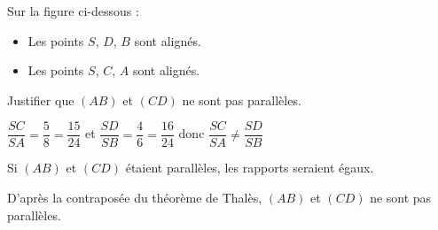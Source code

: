     \phantom{rrr}

    \begin{multicols}{2}
        Sur la figure ci-dessous :
        \begin{itemize}
            \item Les points $S$, $D$, $B$ sont alignés.
            \item Les points $S$, $C$, $A$ sont alignés.
        \end{itemize}

        \columnbreak
        Justifier que $(AB)$ et $(CD)$ ne sont pas parallèles.

        \smallskip
        {\color{red} $\dfrac{SC}{SA}=\dfrac{5}{8}=\dfrac{15}{24}$ et $\dfrac{SD}{SB}=\dfrac{4}{6}=\dfrac{16}{24}$ donc $\dfrac{SC}{SA}\neq \dfrac{SD}{SB}$

        \smallskip
        Si $(AB)$ et $(CD)$ étaient parallèles, les rapports seraient égaux.

        D'après la contraposée du théorème de Thalès, $(AB)$ et $(CD)$ ne sont pas parallèles.
        }
    \end{multicols}

